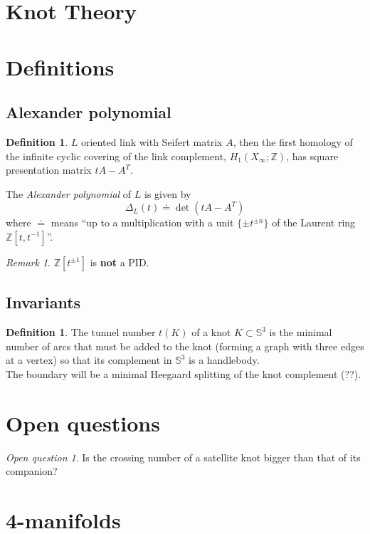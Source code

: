 \documentclass[a4paper]{article}
\theoremstyle{definition}
\newtheorem{definition}[theorem]{Definition}
\theoremstyle{remark}
\newtheorem{remark}[theorem]{Remark}
\newtheorem{openquestion}{Open question}
\newcommand{\sphere}[1]{\mathbb{S}^{#1}}
\newcommand{\Z}{\mathbb{Z}}
\begin{document}
\section{Knot Theory}

\section{Definitions}

\subsection{Alexander polynomial}

\begin{definition}
	$L$ oriented link with Seifert matrix $A$, then the first homology of
	the infinite cyclic covering of the link complement, $H_1(X_{\infty} ; \Z)$,
	has square presentation matrix $t A - A^{T}$.
	
	The \textit{Alexander polynomial} of $L$ is given by
	\begin{equation*}
		\Delta_{L}(t) \doteq \det(t A - A^{T})
	\end{equation*}
	where $\doteq$ means ``up to a multiplication with a unit $\{ \pm t^{\pm n} \}$
	of the Laurent ring $\Z[t, t^{-1}]$''.
\end{definition}

\begin{remark}
	$\Z[t^{\pm 1}]$ is \textbf{not} a PID.
\end{remark}


\subsection{Invariants}

\begin{definition}
	The tunnel number $t(K)$ of a knot $K \subset \sphere{3}$ is the minimal number of arcs
	that must be added to the knot (forming a graph with three edges at a vertex) so that
	its complement in $\sphere{3}$ is a handlebody. \\
	The boundary will be a minimal Heegaard splitting of the knot complement (??).
\end{definition}



\section{Open questions}

\begin{openquestion}
	Is the crossing number of a satellite knot bigger than that of its companion?
\end{openquestion}
	

\section{4-manifolds}

{}


\printindex
\end{document}
